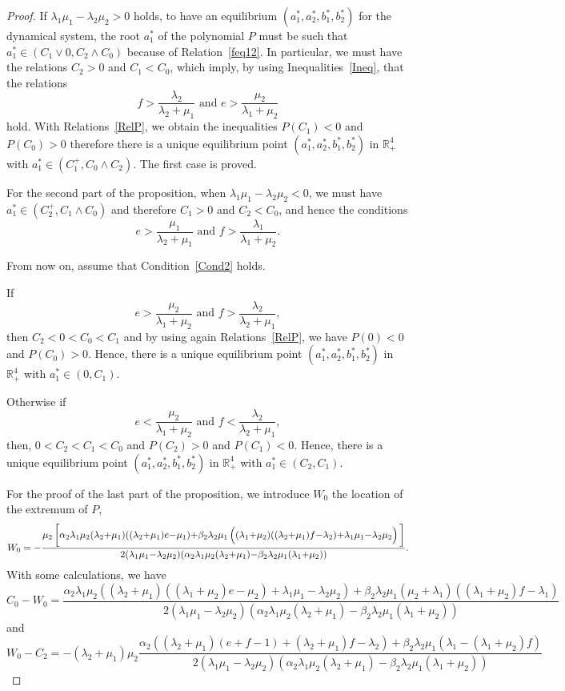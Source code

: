 \documentclass[10pt,a4paper]{amsart}
\newcommand{\R}{\ensuremath{\mathbb{R}}}
\begin{document}
\begin{proof}
If $\lambda_1\mu_1-\lambda_2\mu_2>0$ holds, to have an equilibrium $(a_1^*,a_2^*,b_1^*,b_2^*)$ for the dynamical system, the root $a_1^*$ of the polynomial $P$ must be  such that  $a_1^*{\in}(C_1{\vee}0,C_2{\wedge}C_0)$ because of Relation~\eqref{feq12}.  In particular, we must have the relations $C_2{>}0$ and $C_1{<}C_0$, which imply, by using Inequalities~\eqref{Ineq}, that the relations
\[
f> \frac{\lambda_2}{\lambda_2{+}\mu_1} \text{ and } e >\frac{\mu_2}{\lambda_1{+}\mu_2}
\]
hold. With Relations~\eqref{RelP}, we obtain the inequalities  $P(C_1){<}0$  and $P(C_0){>}0$ therefore there is a unique equilibrium point $(a_1^*,a_2^*,b_1^*,b_2^*)$ in $\R_+^4$ with $a_1^*{\in}(C_1^+,C_0{\wedge}C_2)$. The first case is proved. 


For the second part of the proposition, when $\lambda_1\mu_1{-}\lambda_2\mu_2{<}0$, we must have $a_1^*{\in}(C_2^+,C_1{\wedge}C_0)$ and therefore $C_1{>}0$ and $C_2{<}C_0$, and hence the conditions
\[
e>\frac{\mu_1}{\lambda_2{+}\mu_1} \text{ and }f>\frac{\lambda_1}{\lambda_1{+}\mu_2}.
\]

From now on, assume that Condition~\eqref{Cond2} holds.

If
\[
e> \frac{\mu_2}{\lambda_1{+}\mu_2} \text{ and } f> \frac{\lambda_2}{\lambda_2{+}\mu_1},
\]
then  $C_2{<}0{<}C_0{<}C_1$ and by using again Relations~\eqref{RelP}, we have $P(0){<}0$ and $P(C_0){>}0$. Hence, there is a unique equilibrium point $(a_1^*,a_2^*,b_1^*,b_2^*)$ in $\R_+^4$ with $a_1^*{\in}(0,C_1)$. 

Otherwise if
\[
e< \frac{\mu_2}{\lambda_1{+}\mu_2} \text{ and } f< \frac{\lambda_2}{\lambda_2{+}\mu_1},
\]
then,  $0{<}C_2{<}C_1{<}C_0$ and $P(C_2){>}0$ and $P(C_1){<}0$. Hence, there is a unique equilibrium point $(a_1^*,a_2^*,b_1^*,b_2^*)$ in $\R_+^4$ with $a_1^*{\in}(C_2,C_1)$. 

For the proof of the last part of the proposition, we introduce $W_0$ the location of the extremum of $P$,
 \[
 W_0=-\frac{\mu_2\left[\rule{0mm}{5mm}\alpha_2\lambda_1\mu_2(\lambda_2{+}\mu_1)((\lambda_2{+}\mu_1)e{-}\mu_1){+}\beta_2\lambda_2\mu_1\left(\rule{0mm}{4mm}(\lambda_1{+}\mu_2)((\lambda_2{+}\mu_1)f{-}\lambda_2){+}\lambda_1\mu_1{-}\lambda_2\mu_2\right)\rule{0mm}{5mm}\right]}{2(\lambda_1\mu_1{-}\lambda_2\mu_2)(\alpha_2\lambda_1\mu_2 (\lambda_2{+}\mu_1){-}\beta_2\lambda_2\mu_1(\lambda_1{+}\mu_2))}.
 \]
With some calculations, we have
 \[
 C_0{-}W_0=\frac{\alpha_2\lambda_1\mu_2((\lambda_2{+}\mu_1)((\lambda_1{+}\mu_2)e{-}\mu_2)+\lambda_1\mu_1{-}\lambda_2\mu_2)+ \beta_2\lambda_2\mu_1(\mu_2{+}\lambda_1)((\lambda_1{+}\mu_2)f{-}\lambda_1)}{2(\lambda_1\mu_1{-}\lambda_2\mu_2)(\alpha_2\lambda_1\mu_2 (\lambda_2{+}\mu_1){-}\beta_2\lambda_2\mu_1(\lambda_1{+}\mu_2))}
 \]
 and
  \[
  W_0{-}C_2= -(\lambda_2{+}\mu_1)\mu_2
  \frac{\alpha_2((\lambda_2{+}\mu_1)(e{+}f{-}1){+}(\lambda_2{+}\mu_1)f{-}\lambda_2){+}\beta_2\lambda_2\mu_1(\lambda_1{-}(\lambda_1{+}\mu_2)f)}{2(\lambda_1\mu_1{-}\lambda_2\mu_2)(\alpha_2\lambda_1\mu_2 (\lambda_2{+}\mu_1){-}\beta_2\lambda_2\mu_1(\lambda_1{+}\mu_2))}
  \]


\end{proof}
\end{document}
